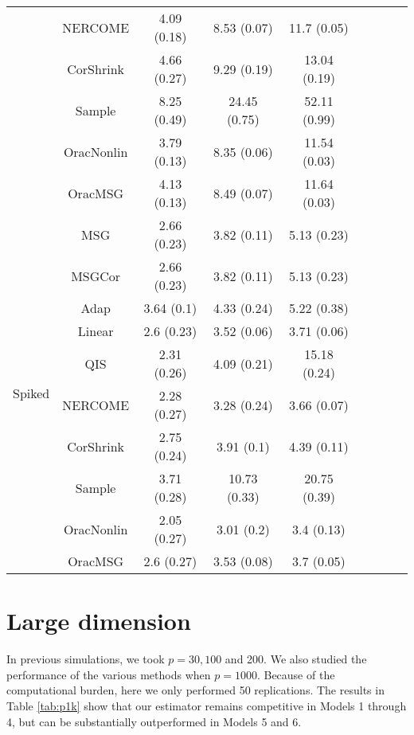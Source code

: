 \documentclass[useAMS,referee,usenatbib]{biom}
\begin{document}
\begin{table}[H]
{\begin{tabular}{ccccccccc}
 & NERCOME        & 4.09 (0.18) & 8.53 (0.07)  & 11.7 (0.05)  \\
 & CorShrink      & 4.66 (0.27) & 9.29 (0.19)  & 13.04 (0.19) \\
 & Sample            & 8.25 (0.49) & 24.45 (0.75) & 52.11 (0.99) \\
 & OracNonlin & 3.79 (0.13) & 8.35 (0.06)  & 11.54 (0.03) \\
 & OracMSG  & 4.13 (0.13) & 8.49 (0.07)  & 11.64 (0.03) \\  \midrule
\multirow{10}{*}{Spiked}  
  & MSG & 2.66 (0.23) & 3.82 (0.11)  & 5.13 (0.23)  \\
 & MSGCor   & 2.66 (0.23) & 3.82 (0.11)  & 5.13 (0.23)  \\
 & Adap     & 3.64 (0.1)  & 4.33 (0.24)  & 5.22 (0.38)  \\
 & Linear         & 2.6 (0.23)  & 3.52 (0.06)  & 3.71 (0.06)  \\
 & QIS            & 2.31 (0.26) & 4.09 (0.21)  & 15.18 (0.24) \\
 & NERCOME        & 2.28 (0.27) & 3.28 (0.24)  & 3.66 (0.07)  \\
 & CorShrink      & 2.75 (0.24) & 3.91 (0.1)   & 4.39 (0.11)  \\
 & Sample            & 3.71 (0.28) & 10.73 (0.33) & 20.75 (0.39) \\
 & OracNonlin & 2.05 (0.27) & 3.01 (0.2)   & 3.4 (0.13)   \\
 & OracMSG  & 2.6 (0.27)  & 3.53 (0.08)  & 3.7 (0.05)  \\ \bottomrule
\end{tabular}%
}
\end{table}

\section{Large dimension}

In previous simulations, we took $p=30,100$ and 200. We also studied the performance of the various methods when $p=1000$. Because of the computational burden, here we only performed 50 replications. The results in Table \ref{tab:p1k} show that our estimator remains competitive in Models 1 through 4, but can be substantially outperformed in Models 5 and 6.
\end{document}
